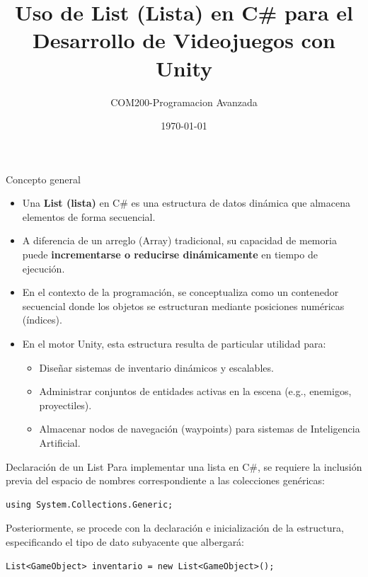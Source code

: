 \documentclass{beamer}
\title{Uso de List (Lista) en C\# para el Desarrollo de Videojuegos con Unity}
\author{COM200-Programacion Avanzada}
\date{\today}
\begin{document}
\begin{frame}
\titlepage
\end{frame}

\begin{frame}{Concepto general}
\begin{itemize}
    \item Una \textbf{List (lista)} en C\# es una estructura de datos dinámica que almacena elementos de forma secuencial.
    \item A diferencia de un arreglo (Array) tradicional, su capacidad de memoria puede \textbf{incrementarse o reducirse dinámicamente} en tiempo de ejecución.
    \item En el contexto de la programación, se conceptualiza como un contenedor secuencial donde los objetos se estructuran mediante posiciones numéricas (índices).
    \item En el motor Unity, esta estructura resulta de particular utilidad para:
    \begin{itemize}
        \item Diseñar sistemas de inventario dinámicos y escalables.
        \item Administrar conjuntos de entidades activas en la escena (e.g., enemigos, proyectiles).
        \item Almacenar nodos de navegación (waypoints) para sistemas de Inteligencia Artificial.
    \end{itemize}
\end{itemize}
\end{frame}

\begin{frame}[fragile]{Declaración de un List}
Para implementar una lista en C\#, se requiere la inclusión previa del espacio de nombres correspondiente a las colecciones genéricas:
\begin{lstlisting}[style=CSharpStyle]
using System.Collections.Generic;
\end{lstlisting}

Posteriormente, se procede con la declaración e inicialización de la estructura, especificando el tipo de dato subyacente que albergará:
\begin{lstlisting}[style=CSharpStyle]
List<GameObject> inventario = new List<GameObject>();
\end{lstlisting}
\end{frame}
\end{document}
